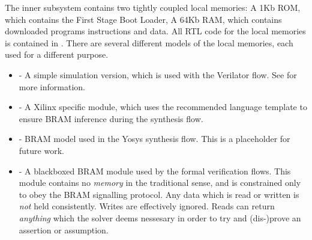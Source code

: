 
The inner subsystem contains two tightly coupled local memories:
A 1Kb ROM, which contains the First Stage Boot Loader,
A 64Kb RAM, which contains downloaded programs instructions and data.
All RTL code for the local memories is contained in .
There are several different models of the local memories, each
used for a different purpose.

\begin{itemize}

\item {} - 
    A simple simulation version, which is used with the Verilator
    flow. See  for more information.

\item {} - 
    A Xilinx specific module, which uses the recommended language
    template to ensure BRAM inference during the synthesis flow.

\item {} - 
    BRAM model used in the Yosys synthesis flow.
    This is a placeholder for future work.

\item {} - 
    A blackboxed BRAM module used by the formal verification flows.
    This module contains no {\em memory} in the traditional sense, and
    is constrained only to obey the BRAM signalling protocol.
    Any data which is read or written is {\em not} held consistently.
    Writes are effectively ignored.
    Reads can return {\em anything} which the solver deems nessesary
    in order to try and (dis-)prove an assertion or assumption.

\end{itemize}
